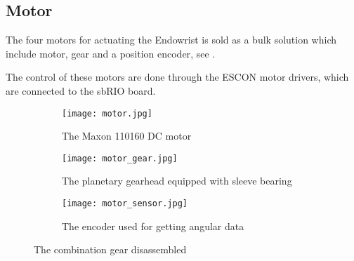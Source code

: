 

\subsection{Motor}\label{Maxon_Motor}
The four motors for actuating the Endowrist is sold as a bulk solution which include motor\cite{motor_motor}, gear\cite{motor_gear} and a position encoder\cite{motor_encoder}, see .

The control of these motors are done through the ESCON motor drivers, which are connected to the sbRIO board.


\begin{figure}[H]
	\centering
	\begin{subfigure}{.32\textwidth}
		\vspace{0pt}
		\centering
		\texttt{[image: motor.jpg]}
		\caption{The Maxon 110160 \newline DC motor}
		\label{fig:motor}
	\end{subfigure}
	\begin{subfigure}{.32\textwidth}
		\centering
		\texttt{[image: motor\_gear.jpg]}
		\caption{The planetary gearhead equipped with sleeve bearing}
		\label{fig:motor_gear}
	\end{subfigure}
	\begin{subfigure}{.32\textwidth}
		\centering
		\texttt{[image: motor\_sensor.jpg]}
		\caption{The encoder used for getting angular data}
		\label{fig:motor_sensor}
	\end{subfigure}
	\caption{The combination gear disassembled}
	\label{fig:Full_motor _dis}
\end{figure}


